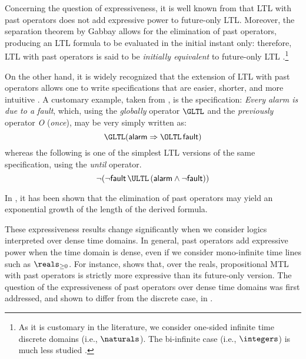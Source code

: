 Concerning the question of expressiveness, it is well known from 
\cite{GPSS80} that LTL with past operators does not add expressive 
power to future-only LTL. Moreover, the separation theorem by 
Gabbay \cite{Gab87} allows for the elimination of past operators, 
producing an LTL formula to be evaluated in the initial instant 
only: therefore, LTL with past operators is said to be \emph{initially equivalent}
to future-only LTL \cite{Eme90}.\footnote{As it is customary in the literature, we consider one-sided infinite time discrete domains (i.e., $\naturals$). The bi-infinite case (i.e., $\integers$) is much less studied \cite{PP04}.}

On the other hand, it is widely recognized that the extension 
of LTL with past operators \cite{Kam68} allows one to write specifications 
that are easier, shorter, and more intuitive \cite{LPZ85}. A customary 
example, taken from \cite{Sch02}, is the specification: \emph{Every alarm is due to a fault},
which, using the \emph{globally} operator $\GLTL$ and the \emph{previously} operator \emph{O}
(\emph{once}), may be very simply written as: 
\begin{equation*}
  \GLTL ( \mathsf{alarm} \Rightarrow \OLTL\, \mathsf{fault} )
\end{equation*}
whereas the following is one of the simplest LTL versions of 
the same specification, using the \emph{until} operator. 
\begin{equation*}
  \neg ( \neg \mathsf{fault} \,\ULTL\, (\mathsf{alarm} \wedge \neg \mathsf{fault} ))
\end{equation*}

In \cite{LMS02}, it has been shown that the elimination of past operators 
may yield an exponential growth of the length of the derived 
formula.

These expressiveness results change significantly when we consider 
logics interpreted over dense time domains. In general, past 
operators add expressive power when the time domain is dense, 
even if we consider mono-infinite time lines such as $\reals_{\geq 0}$. For instance, 
\cite{BCM05} shows that, over the reals, propositional MTL with past 
operators is strictly more expressive than its future-only version. 
The question of the expressiveness of past operators over dense 
time domains was first addressed, and shown to differ from the 
discrete case, in \cite{AH92b,AH93}.


